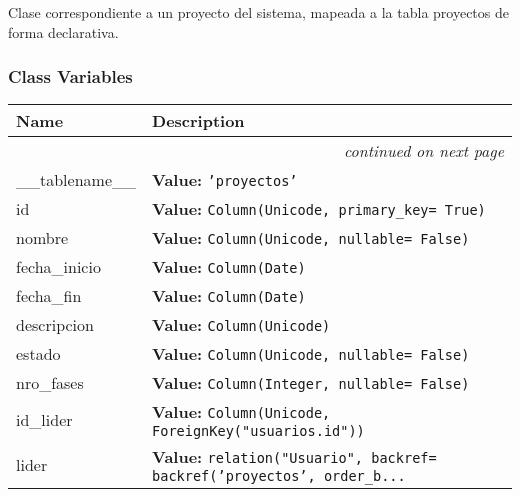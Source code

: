 Clase correspondiente a un proyecto del sistema, mapeada a la tabla 
proyectos de forma declarativa.



  \subsubsection{Class Variables}

    \vspace{-1cm}
\hspace{\varindent}\begin{longtable}{|p{\varnamewidth}|p{\vardescrwidth}|l}
\cline{1-2}
\cline{1-2} \centering \textbf{Name} & \centering \textbf{Description}& \\
\cline{1-2}
\endhead\cline{1-2}\multicolumn{3}{r}{\small\textit{continued on next page}}\\\endfoot\cline{1-2}
\endlastfoot\raggedright \_\-\_\-t\-a\-b\-l\-e\-n\-a\-m\-e\-\_\-\_\- & \raggedright \textbf{Value:} 
{\tt 'proyectos'}&\\
\cline{1-2}
\raggedright i\-d\- & \raggedright \textbf{Value:} 
{\tt Column(Unicode, primary\_key= True)}&\\
\cline{1-2}
\raggedright n\-o\-m\-b\-r\-e\- & \raggedright \textbf{Value:} 
{\tt Column(Unicode, nullable= False)}&\\
\cline{1-2}
\raggedright f\-e\-c\-h\-a\-\_\-i\-n\-i\-c\-i\-o\- & \raggedright \textbf{Value:} 
{\tt Column(Date)}&\\
\cline{1-2}
\raggedright f\-e\-c\-h\-a\-\_\-f\-i\-n\- & \raggedright \textbf{Value:} 
{\tt Column(Date)}&\\
\cline{1-2}
\raggedright d\-e\-s\-c\-r\-i\-p\-c\-i\-o\-n\- & \raggedright \textbf{Value:} 
{\tt Column(Unicode)}&\\
\cline{1-2}
\raggedright e\-s\-t\-a\-d\-o\- & \raggedright \textbf{Value:} 
{\tt Column(Unicode, nullable= False)}&\\
\cline{1-2}
\raggedright n\-r\-o\-\_\-f\-a\-s\-e\-s\- & \raggedright \textbf{Value:} 
{\tt Column(Integer, nullable= False)}&\\
\cline{1-2}
\raggedright i\-d\-\_\-l\-i\-d\-e\-r\- & \raggedright \textbf{Value:} 
{\tt Column(Unicode, ForeignKey("usuarios.id"))}&\\
\cline{1-2}
\raggedright l\-i\-d\-e\-r\- & \raggedright \textbf{Value:} 
{\tt relation("Usuario", backref= backref('proyectos', order\_b\texttt{...}}&\\
\cline{1-2}
\end{longtable}

